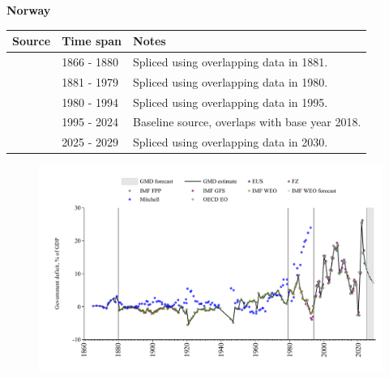 \documentclass[12pt,a4paper,landscape]{article}
\begin{document}
\begin{adjustbox}{max totalsize={\paperwidth}{\paperheight},center}
\begin{minipage}[t][\textheight][t]{\textwidth}
\vspace*{0.5cm}
{}
\begin{center}
{\Large\bfseries Norway}
\end{center}
\vspace{0.5cm}
\begin{table}[H]
\centering
\small
\begin{tabular}{|l|l|l|}
\hline
\textbf{Source} & \textbf{Time span} & \textbf{Notes} \\
\hline
\rowcolor{white}\cite{Mitchell}& 1866 - 1880 &Spliced using overlapping data in 1881.\\
\rowcolor{lightgray}\cite{IMF_FPP}& 1881 - 1979 &Spliced using overlapping data in 1980.\\
\rowcolor{white}\cite{IMF_WEO}& 1980 - 1994 &Spliced using overlapping data in 1995.\\
\rowcolor{lightgray}\cite{EUS}& 1995 - 2024 &Baseline source, overlaps with base year 2018.\\
\rowcolor{white}\cite{IMF_WEO_forecast}& 2025 - 2029 &Spliced using overlapping data in 2030.\\
\hline
\end{tabular}
\end{table}
\begin{figure}[H]
\centering
\includegraphics[width=\textwidth,height=0.6\textheight,keepaspectratio]{graphs/NOR_govdef_GDP.pdf}
\end{figure}
\end{minipage}
\end{adjustbox}
\end{document}
